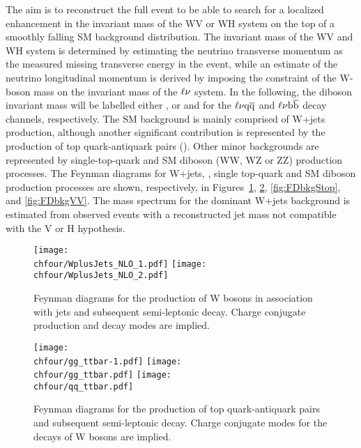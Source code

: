 The aim is to reconstruct the full event to be able to search for a localized enhancement in the invariant mass of the WV or WH system on the top of a smoothly falling SM background distribution.
The invariant mass of the WV and WH system is determined by estimating the neutrino transverse momentum as the measured missing transverse energy in the event,
while an estimate of the neutrino longitudinal momentum is derived by imposing the constraint of the W-boson mass on the invariant mass of the $\ell\nu$ system.
In the following, the diboson invariant mass will be labelled either \mlvj, or \mWV and \mWH for the $\ell\nu\mathrm{q}\overline{\mathrm{q}}$ and $\ell\nu{\mathrm{b}\overline{\mathrm{b}}}$ decay channels, respectively.
The SM background is mainly comprised of W+jets production, although another significant contribution is represented by the production of top quark-antiquark pairs (\ttbar).
Other minor backgrounds are represented by single-top-quark and SM diboson (WW, WZ or ZZ) production processes.
The Feynman diagrams for W+jets, \ttbar, single top-quark and SM diboson production processes are shown, respectively, in Figures~\ref{fig:FDbkgWJets}, \ref{fig:FDbkgttbar}, \ref{fig:FDbkgStop}, and \ref{fig:FDbkgVV}.
The mass spectrum for the dominant W+jets background is estimated from observed events with a reconstructed jet mass not compatible with the V or H hypothesis.\\ 

\begin{figure}[!htb]
\centering
\texttt{[image: \\chfour/WplusJets\_NLO\_1.pdf]}
\texttt{[image: \\chfour/WplusJets\_NLO\_2.pdf]}
\caption{Feynman diagrams for the production of W bosons in association with jets and subsequent semi-leptonic decay. Charge conjugate production and decay modes are implied.}
\label{fig:FDbkgWJets}
\end{figure}

\begin{figure}[!htb]
\centering
\texttt{[image: \\chfour/gg\_ttbar-1.pdf]}
\texttt{[image: \\chfour/gg\_ttbar.pdf]}
\texttt{[image: \\chfour/qq\_ttbar.pdf]}
\caption{Feynman diagrams for the production of top quark-antiquark pairs and subsequent semi-leptonic decay. Charge conjugate modes for the decays of W bosons are implied.}
\label{fig:FDbkgttbar}
\end{figure}

